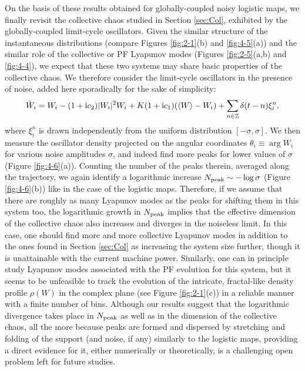 \documentclass[12pt]{iopart}
\begin{document}
On the basis of these results obtained
 for globally-coupled noisy logistic maps,
 we finally revisit the collective chaos studied in Section \ref{sec:Col},
 exhibited by the globally-coupled limit-cycle oscillators.
Given the similar structure of the instantaneous distributions
 (compare Figures \ref{fig:2-1}(b) and \ref{fig:4-5}(a))
 and the similar role of the collective or PF Lyapunov modes
 (Figures \ref{fig:2-5}(a,b) and \ref{fig:4-4}),
 we expect that these two systems may share
 basic properties of the collective chaos.
We therefore consider the limit-cycle oscillators in the presence of noise,
 added here sporadically for the sake of simplicity:
\begin{equation}
 \dot{W}_i = W_i - (1+\mathrm{i}c_2)|W_i|^2 W_i + K (1+\mathrm{i}c_1) (\langle W \rangle - W_i) + \sum_{n\in\mathbb{Z}} \delta(t - n)\xi_i^n,   \label{eq:NoisyGLDef}
\end{equation}
 where $\xi_i^n$ is drawn independently from the uniform distribution
 $[-\sigma,\sigma]$.
We then measure the oscillator density projected on the angular coordinates
 $\theta_i \equiv \arg W_i$ for various noise amplitudes $\sigma$,
 and indeed find more peaks for lower values of $\sigma$
 (Figure \ref{fig:4-6}(a)).
Counting the number of the peaks therein, averaged along the trajectory,
 we again identify a logarithmic increase $N_{\rm peak} \sim -\log\sigma$
 (Figure \ref{fig:4-6}(b)) like in the case of the logistic maps.
Therefore, if we assume that there are
 roughly as many Lyapunov modes as the peaks for shifting them
 in this system too,
 the logarithmic growth in $N_{\rm peak}$ implies
 that the effective dimension of the collective chaos
 also increases and diverges in the noiseless limit.
In this case, one should find more and more collective Lyapunov modes
 in addition to the ones found in Section \ref{sec:Col}
 as increasing the system size further, though it is unattainable
 with the current machine power.
Similarly, one can in principle study Lyapunov modes
 associated with the PF evolution for this system,
 but it seems to be unfeasible to track
 the evolution of the intricate, fractal-like density profile $\rho(W)$
 in the complex plane (see Figure \ref{fig:2-1}(c))
 in a reliable manner with a finite number of bins.
Although our results suggest that the logarithmic divergence takes place
 in $N_{\rm peak}$ as well as in the dimension of the collective chaos,
 all the more because peaks are formed and dispersed
 by stretching and folding of the support (and noise, if any)
 similarly to the logistic maps,
 providing a direct evidence for it, either numerically or theoretically,
 is a challenging open problem left for future studies.
\end{document}
